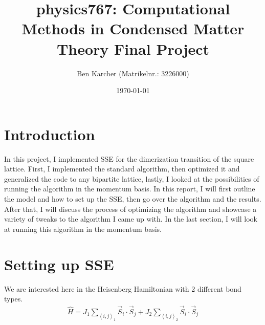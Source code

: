 \documentclass[ngerman]{scrartcl}
\title{physics767: Computational Methods in Condensed Matter Theory Final Project}
\author{Ben Karcher (Matrikelnr.: 3226000)}
\date{\today}
\begin{document}
\maketitle
\section*{Introduction}
In this project, I implemented SSE for the dimerization transition of the square lattice. First, I implemented the standard algorithm, then optimized it and generalized the code to any bipartite lattice, lastly, I looked at the possibilities of running the algorithm in the momentum basis. In this report, I will first outline the model and how to set up the SSE, then go over the algorithm and the results. After that, I will discuss the process of optimizing the algorithm and showcase a variety of tweaks to the algorithm I came up with. In the last section, I will look at running this algorithm in the momentum basis.
\section*{Setting up SSE}
We are interested here in the Heisenberg Hamiltonian with 2 different bond types.
\begin{align*}
    \hat{H}=J_1\sum_{\left<i,j\right>_1}\Vec{S}_i\cdot\Vec{S}_j + J_2\sum_{\left<i,j\right>_2}\Vec{S}_i\cdot\Vec{S}_j
\end{align*}
\end{document}
